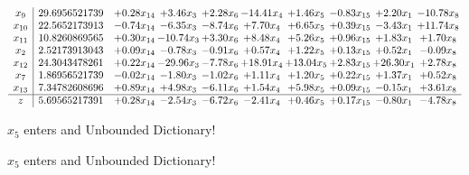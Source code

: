 \documentclass[9pt]{article}
\begin{document}
 \[\begin{array}{c| c c@{\hskip 2pt} c@{\hskip 2pt} c@{\hskip 2pt} c@{\hskip 2pt} c@{\hskip 2pt} c@{\hskip 2pt} c@{\hskip 2pt} c@{\hskip 2pt} }
 x_{9}   &  29.6956521739 & +  0.28 x_{14} & +  3.46 x_{3} & +  2.28 x_{6} & -14.41 x_{4} & +  1.46 x_{5} & -0.83 x_{15} & +  2.20 x_{1} & -10.78 x_{8}\\
 x_{10}   &  22.5652173913 & -0.74 x_{14} & -6.35 x_{3} & -8.74 x_{6} & +  7.70 x_{4} & +  6.65 x_{5} & +  0.39 x_{15} & -3.43 x_{1} & + 11.74 x_{8}\\
 x_{11}   &  10.8260869565 & +  0.30 x_{14} & -10.74 x_{3} & +  3.30 x_{6} & +  8.48 x_{4} & +  5.26 x_{5} & +  0.96 x_{15} & +  1.83 x_{1} & +  1.70 x_{8}\\
 x_{2}   &  2.52173913043 & +  0.09 x_{14} & -0.78 x_{3} & -0.91 x_{6} & +  0.57 x_{4} & +  1.22 x_{5} & +  0.13 x_{15} & +  0.52 x_{1} & -0.09 x_{8}\\
 x_{12}   &  24.3043478261 & +  0.22 x_{14} & -29.96 x_{3} & -7.78 x_{6} & + 18.91 x_{4} & + 13.04 x_{5} & +  2.83 x_{15} & + 26.30 x_{1} & +  2.78 x_{8}\\
 x_{7}   &  1.86956521739 & -0.02 x_{14} & -1.80 x_{3} & -1.02 x_{6} & +  1.11 x_{4} & +  1.20 x_{5} & +  0.22 x_{15} & +  1.37 x_{1} & +  0.52 x_{8}\\
 x_{13}   &  7.34782608696 & +  0.89 x_{14} & +  4.98 x_{3} & -6.11 x_{6} & +  1.54 x_{4} & +  5.98 x_{5} & +  0.09 x_{15} & -0.15 x_{1} & +  3.61 x_{8}\\
\hline
z    &  5.69565217391 & +  0.28 x_{14} & -2.54 x_{3} & -6.72 x_{6} & -2.41 x_{4} & +  0.46 x_{5} & +  0.17 x_{15} & -0.80 x_{1} & -4.78 x_{8}\\
\end{array}\]


 $ x_{5} $ enters and Unbounded Dictionary!


 $ x_{5} $ enters and Unbounded Dictionary!
\end{document}
